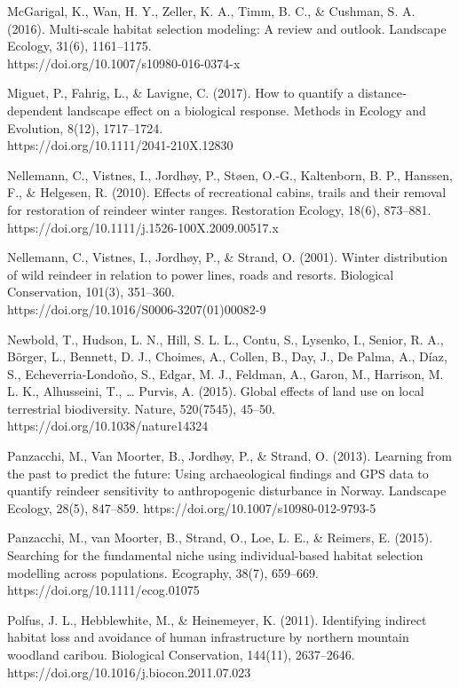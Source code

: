 \documentclass[titlepage]{article}
\begin{document}
McGarigal, K., Wan, H. Y., Zeller, K. A., Timm, B. C., & Cushman, S. A. (2016). Multi-scale habitat selection modeling: A review and outlook. Landscape Ecology, 31(6), 1161–1175.\\ https://doi.org/10.1007/s10980-016-0374-x

Miguet, P., Fahrig, L., & Lavigne, C. (2017). How to quantify a distance‐dependent landscape effect on a biological response. Methods in Ecology and Evolution, 8(12), 1717–1724. \\
https://doi.org/10.1111/2041-210X.12830

Nellemann, C., Vistnes, I., Jordhøy, P., Støen, O.-G., Kaltenborn, B. P., Hanssen, F., & Helgesen, R. (2010). Effects of recreational cabins, trails and their removal for restoration of reindeer winter ranges. Restoration Ecology, 18(6), 873–881. https://doi.org/10.1111/j.1526-100X.2009.00517.x

Nellemann, C., Vistnes, I., Jordhøy, P., & Strand, O. (2001). Winter distribution of wild reindeer in relation to power lines, roads and resorts. Biological Conservation, 101(3), 351–360.\\ https://doi.org/10.1016/S0006-3207(01)00082-9

Newbold, T., Hudson, L. N., Hill, S. L. L., Contu, S., Lysenko, I., Senior, R. A., Börger, L., Bennett, D. J., Choimes, A., Collen, B., Day, J., De Palma, A., Díaz, S., Echeverria-Londoño, S., Edgar, M. J., Feldman, A., Garon, M., Harrison, M. L. K., Alhusseini, T., … Purvis, A. (2015). Global effects of land use on local terrestrial biodiversity. Nature, 520(7545), 45–50. https://doi.org/10.1038/nature14324

Panzacchi, M., Van Moorter, B., Jordhøy, P., & Strand, O. (2013). Learning from the past to predict the future: Using archaeological findings and GPS data to quantify reindeer sensitivity to anthropogenic disturbance in Norway. Landscape Ecology, 28(5), 847–859. https://doi.org/10.1007/s10980-012-9793-5

Panzacchi, M., van Moorter, B., Strand, O., Loe, L. E., & Reimers, E. (2015). Searching for the fundamental niche using individual-based habitat selection modelling across populations. Ecography, 38(7), 659–669. https://doi.org/10.1111/ecog.01075

Polfus, J. L., Hebblewhite, M., & Heinemeyer, K. (2011). Identifying indirect habitat loss and avoidance of human infrastructure by northern mountain woodland caribou. Biological Conservation, 144(11), 2637–2646. https://doi.org/10.1016/j.biocon.2011.07.023
\end{document}

